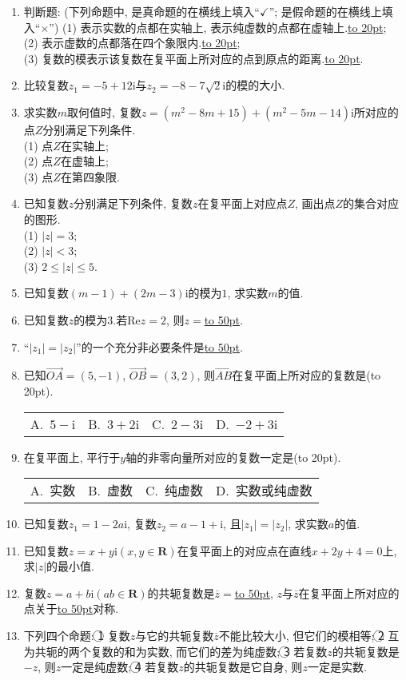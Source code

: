 \documentclass[10pt,a4paper]{article}
\newcommand{\blank}[1]{\underline{\hbox to #1pt{}}}
\newcommand{\bracket}[1]{(\hbox to #1pt{})}
\newcommand{\fourch}[4]{\par\begin{tabular}{p{.23\textwidth}p{.23\textwidth}p{.23\textwidth}p{.23\textwidth}}
A.~#1 &B.~#2& C.~#3& D.~#4
\end{tabular}}
\begin{document}
\begin{enumerate}[1.]
\item 判断题: (下列命题中, 是真命题的在横线上填入``$\checkmark$''; 是假命题的在横线上填入``$\times$'')
(1) 表示实数的点都在实轴上, 表示纯虚数的点都在虚轴上.\blank{20};\\
(2) 表示虚数的点都落在四个象限内.\blank{20};\\
(3) 复数的模表示该复数在复平面上所对应的点到原点的距离.\blank{20}.
\item 比较复数$z_1=-5+12\mathrm{i}$与$z_2=-8-7\sqrt 2\mathrm{i}$的模的大小.
\item 求实数$m$取何值时, 复数$z=(m^2-8m+15)+(m^2-5m-14)\mathrm{i}$所对应的点$Z$分别满足下列条件.\\
(1) 点$Z$在实轴上;\\
(2) 点$Z$在虚轴上;\\
(3) 点$Z$在第四象限.
\item 已知复数$z$分别满足下列条件, 复数$z$在复平面上对应点$Z$, 画出点$Z$的集合对应的图形.\\
(1) $|z|=3$;\\ 
(2) $|z|<3$;\\
(3) $2\le|z|\le 5$.
\item 已知复数$(m-1)+(2m-3)\mathrm{i}$的模为$1$, 求实数$m$的值.
\item 已知复数$z$的模为$3$.若$\mathrm{Re}z=2$, 则$z=$\blank{50}.
\item ``$|z_1|=|z_2|$''的一个充分非必要条件是\blank{50}.
\item 已知$\overrightarrow{OA}=(5,-1)$, $\overrightarrow{OB}=(3,2)$, 则$\overrightarrow{AB}$在复平面上所对应的复数是\bracket{20}.
\fourch{$5-\mathrm{i}$}{$3+2\mathrm{i}$}{$2-3\mathrm{i}$}{$-2+3\mathrm{i}$}
\item 在复平面上, 平行于$y$轴的非零向量所对应的复数一定是\bracket{20}.
\fourch{实数}{虚数}{纯虚数}{实数或纯虚数}
\item 已知复数$z_1=1-2a\mathrm{i}$, 复数$z_2=a-1+\mathrm{i}$, 且$|z_1|=|z_2|$, 求实数$a$的值.
\item 已知复数$z=x+y\mathrm{i}(x,y\in \mathbf{R})$在复平面上的对应点在直线$x+2y+4=0$上, 求$|z|$的最小值.
\item 复数$z=a+b\mathrm{i}(ab\in \mathbf{R})$的共轭复数是$\overline  z=$\blank{50}, $z$与$\overline  z$在复平面上所对应的点关于\blank{50}对称.
\item 下列四个命题:
\textcircled{1} 复数$z$与它的共轭复数$\overline  z$不能比较大小, 但它们的模相等;
\textcircled{2} 互为共轭的两个复数的和为实数, 而它们的差为纯虚数;
\textcircled{3} 若复数$z$的共轭复数是$-z$, 则$z$一定是纯虚数;
\textcircled{4} 若复数$z$的共轭复数是它自身, 则$z$一定是实数.

\end{enumerate}
\end{document}
